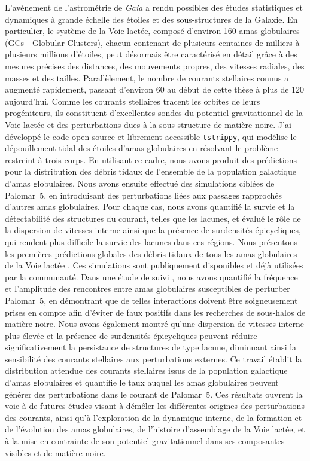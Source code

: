 L'avènement de l'astrométrie de \textit{Gaia} a rendu possibles des études statistiques et dynamiques à grande échelle des étoiles et des sous-structures de la Galaxie. En particulier, le système de la Voie lactée, composé d'environ 160 amas globulaires (GCs - Globular Clusters), chacun contenant de plusieurs centaines de milliers à plusieurs millions d'étoiles, peut désormais être caractérisé en détail grâce à des mesures précises des distances, des mouvements propres, des vitesses radiales, des masses et des tailles. Parallèlement, le nombre de courants stellaires connus a augmenté rapidement, passant d'environ 60 au début de cette thèse à plus de 120 aujourd'hui. Comme les courants stellaires tracent les orbites de leurs progéniteurs, ils constituent d'excellentes sondes du potentiel gravitationnel de la Voie lactée et des perturbations dues à la sous-structure de matière noire. J'ai développé le code open source et librement accessible \texttt{tstrippy}, qui modélise le dépouillement tidal des étoiles d'amas globulaires en résolvant le problème restreint à trois corps. En utilisant ce cadre, nous avons produit des prédictions pour la distribution des débris tidaux de l'ensemble de la population galactique d'amas globulaires. Nous avons ensuite effectué des simulations ciblées de Palomar~5, en introduisant des perturbations liées aux passages rapprochés d'autres amas globulaires. Pour chaque cas, nous avons quantifié la survie et la détectabilité des structures du courant, telles que les lacunes, et évalué le rôle de la dispersion de vitesses interne ainsi que la présence de surdensités épicycliques, qui rendent plus difficile la survie des lacunes dans ces régions. Nous présentons les premières prédictions globales des débris tidaux de tous les amas globulaires de la Voie lactée \citep{2023A&A...673A..44F}. Ces simulations sont publiquement disponibles et déjà utilisées par la communauté. Dans une étude de suivi \citep{2025A&A...699A.289F}, nous avons quantifié la fréquence et l'amplitude des rencontres entre amas globulaires susceptibles de perturber Palomar~5, en démontrant que de telles interactions doivent être soigneusement prises en compte afin d'éviter de faux positifs dans les recherches de sous-halos de matière noire. Nous avons également montré qu'une dispersion de vitesses interne plus élevée et la présence de surdensités épicycliques peuvent réduire significativement la persistance de structures de type lacune, diminuant ainsi la sensibilité des courants stellaires aux perturbations externes. Ce travail établit la distribution attendue des courants stellaires issus de la population galactique d'amas globulaires et quantifie le taux auquel les amas globulaires peuvent générer des perturbations dans le courant de Palomar~5. Ces résultats ouvrent la voie à de futures études visant à démêler les différentes origines des perturbations des courants, ainsi qu'à l'exploration de la dynamique interne, de la formation et de l'évolution des amas globulaires, de l'histoire d'assemblage de la Voie lactée, et à la mise en contrainte de son potentiel gravitationnel dans ses composantes visibles et de matière noire.

